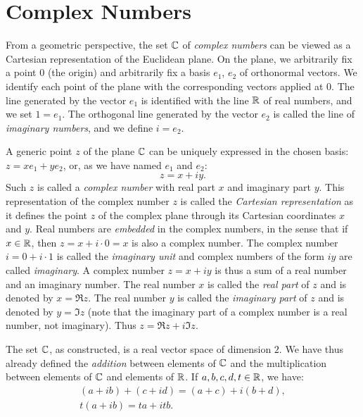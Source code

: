 \section{Complex Numbers}
%
%
%
\label{sec:complessi}

From a geometric perspective, the set $\CC$ of \emph{complex numbers}%
%
\index{$\CC$}
can be viewed as a Cartesian representation of the Euclidean plane.
On the plane, we arbitrarily fix a point $0$ (the origin) and arbitrarily fix a
basis $e_1$, $e_2$ of orthonormal vectors.
We identify each point of the plane with the corresponding vectors applied at
$0$. The line generated by the vector $e_1$ is identified with the line ${\mathbb R}$ of
real numbers, and we set $1=e_1$.
The orthogonal line generated by the vector $e_2$ is called the line of
\emph{imaginary numbers}, and we define $i=e_2$.

A generic point $z$ of the plane $\CC$ can be uniquely expressed in the chosen
basis: $z = x e_1 + y e_2$, or, as we have named $e_1$ and $e_2$:
\[
z = x + i y.
\]
Such $z$ is called a \emph{complex number} with real part $x$ and imaginary part
$y$.
This representation of the complex number $z$ is called the \emph{Cartesian
representation}%
%
 as it defines the point $z$ of the complex plane through its Cartesian coordinates $x$ and $y$.
Real numbers are \emph{embedded} in the complex numbers, in the sense that if
$x\in {\mathbb R}$, then $z= x + i\cdot 0 = x$ is also a complex number.
The complex number $i = 0 + i\cdot 1$ is called the \emph{imaginary unit}%
%
and complex numbers of the form $iy$ are called \emph{imaginary}.
A complex number $z = x+iy$ is thus a sum of a real number and an imaginary
number. The real number $x$ is called the \emph{real part}
of $z$ and is denoted by $x=\Re z$.
%
The real number $y$ is called the \emph{imaginary part}
of $z$ and is denoted by $y=\Im z$
%
(note that the imaginary part of a complex number is a real number, not
imaginary). Thus $z= \Re z + i \Im z$.

The set $\CC$, as constructed, is a real vector space of dimension $2$.
We have thus already defined the \emph{addition}%
%
between elements of $\CC$ and the multiplication between elements of $\CC$ and
elements of ${\mathbb R}$.
If $a,b,c,d,t\in {\mathbb R}$, we have:
\begin{gather*}
 (a+ib) + (c+id) = (a+c) + i (b+d), \\
 t(a+ib) = ta + itb.
\end{gather*}

